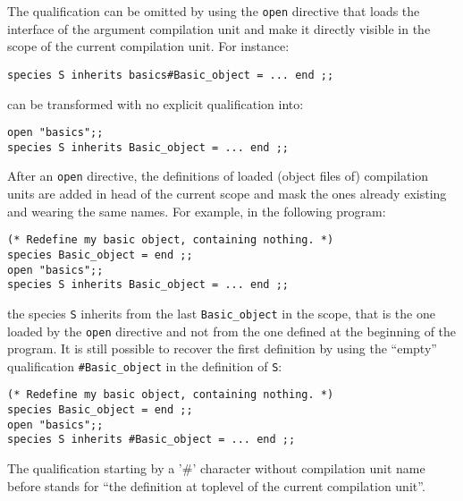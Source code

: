 The qualification can be omitted by using the {\tt open} directive
that loads the interface of the argument compilation unit and make it
directly visible in the scope of the current compilation unit. For
instance:

{\scriptsize
\begin{lstlisting}
species S inherits basics#Basic_object = ... end ;;
\end{lstlisting}
}
can be transformed with no explicit qualification into:
{\scriptsize
\begin{lstlisting}
open "basics";;
species S inherits Basic_object = ... end ;;
\end{lstlisting}
}

After an {\tt open} directive, the definitions of loaded (object files
of) compilation units are added in head of the current scope and mask
the ones already existing and wearing the same names. For example, in
the following program: {\scriptsize
\begin{lstlisting}
(* Redefine my basic object, containing nothing. *)
species Basic_object = end ;;
open "basics";;
species S inherits Basic_object = ... end ;;
\end{lstlisting}
}
the species {\tt S} inherits from the last {\tt Basic\_object} in the
scope, that is the one loaded by the {\tt open} directive and not from
the one defined at the beginning of the program. It is still possible
to recover the first definition by using the ``empty'' qualification
{\tt \#Basic\_object} in the definition of {\tt S}:
{\scriptsize
\begin{lstlisting}
(* Redefine my basic object, containing nothing. *)
species Basic_object = end ;;
open "basics";;
species S inherits #Basic_object = ... end ;;
\end{lstlisting}
}

The qualification starting by a '\#' character without compilation
unit name before stands for ``the definition at toplevel of the
current compilation unit''.



